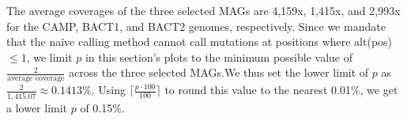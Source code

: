 The average coverages of the three selected MAGs are 4,159x, 1,415x, and 2,993x for the CAMP, BACT1, and BACT2 genomes, respectively. Since we mandate that the na\"ive calling method cannot call mutations at positions where alt(pos) $\leq 1$, we limit $p$ in this section's plots to the minimum possible value of $\frac{2}{\text{average coverage}}$ across the three selected MAGs.We thus set the lower limit of $p$ as $\frac{2}{1,415.07} \approx 0.1413\%$. Using $\big\lceil \frac{p \cdot 100}{100} \big\rceil$ to round this value to the nearest 0.01\%, we get a lower limit $p$ of 0.15\%.\endinput